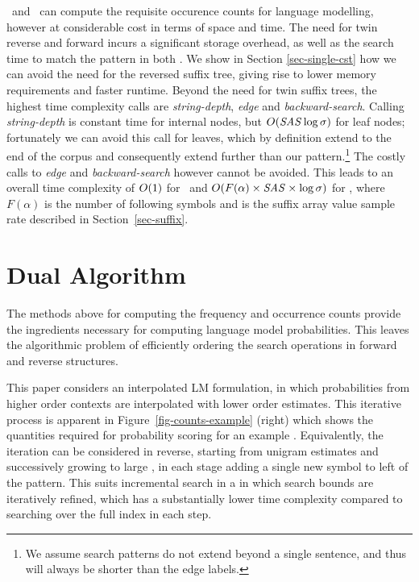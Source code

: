 \nlplusname\ and \nlplusfrontbackname\ can compute the requisite occurence counts for \ngram language modelling, however at considerable cost in terms of space and time. 
The need for twin reverse and forward \CSTs incurs a significant storage overhead, as well as the search time to match the pattern in both \CSTs. 
We show in Section \ref{sec-single-cst}  how we can avoid the need for the reversed suffix  tree, giving rise to lower memory requirements and faster runtime. 
Beyond the need for twin suffix trees, the highest time complexity calls are \emph{string-depth}, \emph{edge} and \emph{backward-search}.
Calling \emph{string-depth} is constant time for internal nodes, but $O(\mbox{\emph{SAS}} \log\sigma)$ for leaf nodes; fortunately we can avoid this call for leaves, which by definition extend to the end of the corpus and consequently extend further than our pattern.\footnote{We assume search patterns do not extend beyond a single sentence, and thus will always be shorter than the edge labels.}
The costly calls to \emph{edge} and \emph{backward-search} however cannot be avoided.
This leads to an overall time complexity of $O(1)$ for \nlplusname\ and $O(F(\alpha) \times \mbox{\emph{SAS}} \times \log\sigma)$ for \nlplusfrontbackname, where $F(\alpha)$ is the number of following symbols and \SASAMPLE is the suffix array value sample rate described
in Section~\ref{sec-suffix}.

\section{Dual \CST Algorithm} 
\label{sec-dual-cst}

The methods above for computing the frequency and occurrence
counts provide the ingredients necessary for computing \ngram language model
probabilities. This leaves the algorithmic problem of efficiently ordering the search 
operations in forward and reverse \CST structures.

This paper considers an interpolated LM formulation, in which
probabilities from higher order contexts are interpolated with lower
order estimates.
This iterative process is apparent in Figure~\ref{fig-counts-example} (right) which shows the quantities required for probability scoring for an example \ngram.
Equivalently, the iteration can be considered in reverse, starting from unigram estimates and successively growing to large \ngrams, in each stage adding a single new symbol to left of the pattern. 
This suits incremental search in a \CST in which search bounds are
iteratively refined, which has a substantially lower time complexity
compared to searching over the full index in each step.


